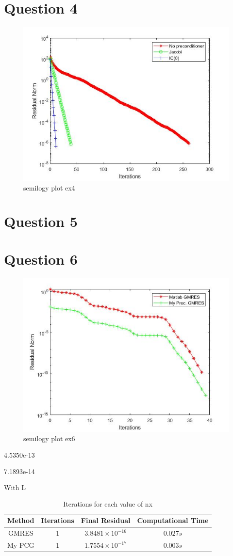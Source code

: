 \documentclass[a4paper, 11pt]{article}
\begin{document}
		
		
		
		\section*{Question 4}		
		\begin{figure}[H]
			\centering
			\includegraphics[width=.6\linewidth]{ex4.jpg}
			\caption{semilogy plot ex4}
			\label{fig:ex4}
		\end{figure}
		
		
		\section*{Question 5}
		
		
		\section*{Question 6}
		\begin{figure}[H]
			\centering
			\includegraphics[width=.6\linewidth]{ex6.jpg}
			\caption{semilogy plot ex6}
			\label{fig:ex6}
		\end{figure}
		
		4.5350e-13
		
		7.1893e-14
		
			
		
		With L
		
		\begin{table}[H]
			\centering
			\begin{tabular}{c|c|c|c}
				\textbf{Method} &  \textbf{Iterations} 	& \textbf{Final Residual} 		& \textbf{Computational Time} 	\\ \hline
				GMRES 			& 			1 			& $ 3.8481 \times 10^{-16} $	& $ 0.027 s $	\\ \hline	
				My PCG 			& 			1			& $ 1.7554 \times 10^{-17} $	& $ 0.003 s $	\\ \hline
			\end{tabular}
			\caption{Iterations for each value of nx}
			\label{table:ex4_c_prec}
		\end{table}	
	
\end{document}
